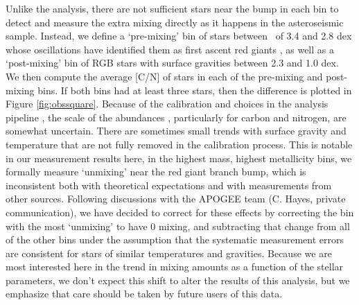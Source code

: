 Unlike the \citet{Shetrone2019} analysis, there are not sufficient stars near the bump in each bin to detect and measure the extra mixing directly as it happens in the asteroseismic sample. Instead, we define a `pre-mixing' bin of stars between \logg\ of  3.4 and 2.8 dex whose oscillations have identified them as first ascent red giants \citep{Elsworth2019}, as well as a `post-mixing' bin of RGB stars with surface gravities between 2.3 and 1.0 dex. We then compute the average [C/N] of stars in each of the pre-mixing and post-mixing bins. If both bins had at least three stars, then the difference is plotted in Figure \ref{fig:obssquare}. Because of the calibration and choices in the analysis pipeline
\citep[see e.g.][]{Holtzman2018,Jonsson2020, vsmith_apogee_dr16_2021}, the scale of the abundances%
, particularly for carbon and nitrogen,
are somewhat uncertain.
There are sometimes small trends with surface gravity and temperature that are not fully removed in the calibration process. This is notable in our measurement results here, in the highest mass, highest metallicity bins, we formally measure `unmixing' near the red giant branch bump, which is inconsistent both with theoretical expectations and with measurements from other sources. Following discussions with the APOGEE team (C. Hayes, private communication), we have decided to correct for these effects by correcting the bin with the most `unmixing' to have 0 mixing, and subtracting that change from all of the other bins under the assumption that the systematic measurement errors are consistent for stars of similar temperatures and gravities. Because we are most interested here in the trend in mixing amounts as a function of the stellar parameters, we don't expect this shift to alter the results of this analysis, but we emphasize that care should be taken by future users of this data. 

